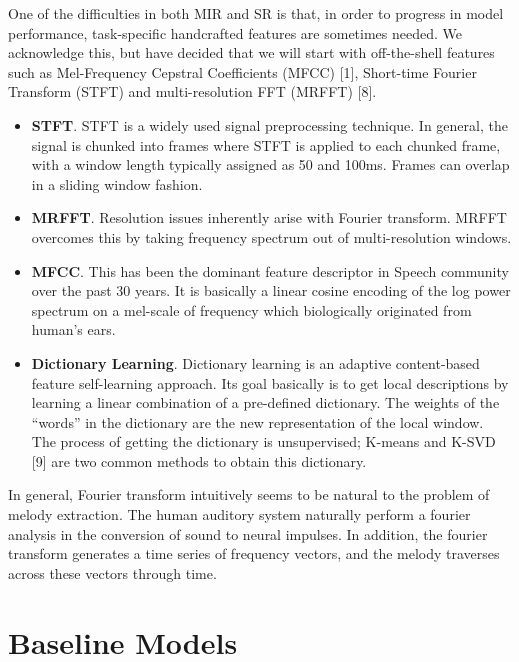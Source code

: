 \documentclass{article} %
\begin{document}
One of the difficulties in both MIR and SR is that, in order to progress in model performance, task-specific handcrafted features are sometimes needed.  We acknowledge this, but have decided that we will start with off-the-shell features such as Mel-Frequency Cepstral Coefficients (MFCC) [1], Short-time Fourier Transform (STFT) and multi-resolution FFT (MRFFT) [8].

\begin{itemize}
\item \textbf{STFT}. STFT is a widely used signal preprocessing technique. In general, the signal is chunked into frames where STFT is applied to each chunked frame, with a window length typically assigned as 50 and 100ms. Frames can overlap in a sliding window fashion.

\item \textbf{MRFFT}. Resolution issues inherently arise with Fourier transform. MRFFT overcomes this by taking frequency spectrum out of multi-resolution windows.

\item \textbf{MFCC}. This has been the dominant feature descriptor in Speech community over the past 30 years. It is basically a linear cosine encoding of the log power spectrum on a mel-scale of frequency which biologically originated from human's ears. 

\item \textbf{Dictionary Learning}. Dictionary learning is an adaptive content-based feature self-learning approach. Its goal basically is to get local descriptions by learning a linear combination of a pre-defined dictionary. 
The weights of the “words” in the dictionary are the new representation of the local window. The process of getting the dictionary is unsupervised; K-means and K-SVD [9] are two common methods to obtain this dictionary.
\end{itemize}

In general, Fourier transform intuitively seems to be natural to the problem of melody extraction.  The human auditory system naturally perform a fourier analysis in the conversion of sound to neural impulses.  In addition, the fourier transform generates a time series of frequency vectors, and the melody traverses across these vectors through time.

\section{Baseline Models}
\end{document}
